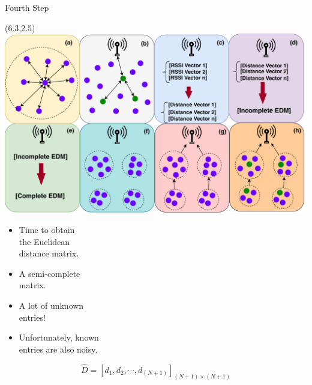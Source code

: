 \documentclass{beamer}
\begin{document}
\begin{frame}[t]{Fourth Step} %
\begin{textblock}{0.8}(6.3,2.5)
\includegraphics[scale=0.35]{figure/Steps.pdf}
\end{textblock}

\begin{itemize}

\small

\item Time to obtain \\ the Euclidean \\ distance matrix.

\item A semi-complete \\ matrix.

\item A lot of unknown \\ entries!

\item Unfortunately, known \\ entries are also noisy.

\end{itemize}

\begin{equation}
\hat{D}=[d_{1},d_{2},\cdots,d_{(N+1)}]_{(N+1)\times(N+1)}
\end{equation}

\end{frame}
\end{document}
